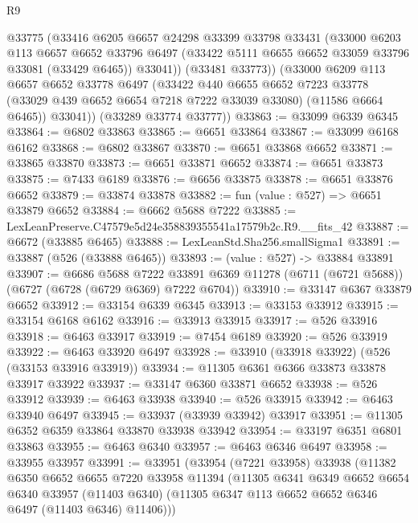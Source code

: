 \begin{lexlean}{R9}
\begin{coremodule}
          @33775
          (@33416
            @6205
            @6657
            @24298
            @33399
            @33798
            @33431
            (@33000
              @6203
              @113
              @6657
              @6652
              @33796
              @6497
              (@33422 @5111 @6655 @6652 @33059 @33796 @33081 (@33429 @6465))
              @33041))
          (@33481 @33773))
        (@33000
          @6209
          @113
          @6657
          @6652
          @33778
          @6497
          (@33422
            @440
            @6655
            @6652
            @7223
            @33778
            (@33029 @439 @6652 @6654 @7218 @7222 @33039 @33080)
            (@11586 @6664 @6465))
          @33041))
      (@33289 @33774 @33777))
@33863 := @33099 @6339 @6345
@33864 := @6802 @33863
@33865 := @6651 @33864
@33867 := @33099 @6168 @6162
@33868 := @6802 @33867
@33870 := @6651 @33868 @6652
@33871 := @33865 @33870
@33873 := @6651 @33871 @6652
@33874 := @6651 @33873
@33875 := @7433 @6189
@33876 := @6656 @33875
@33878 := @6651 @33876 @6652
@33879 := @33874 @33878
@33882 := fun (value : @527) => @6651 @33879 @6652
@33884 := @6662 @5688 @7222
@33885 := LexLeanPreserve.C47579e5d24e358839355541a17579b2c.R9.__fits_42
@33887 := @6672 (@33885 @6465)
@33888 := LexLeanStd.Sha256.smallSigma1
@33891 := @33887 (@526 (@33888 @6465))
@33893 := (value : @527) -> @33884 @33891
@33907 := @6686
    @5688
    @7222
    @33891
    @6369
    @11278
    (@6711 (@6721 @5688))
    (@6727 (@6728 (@6729 @6369) @7222 @6704))
@33910 := @33147 @6367 @33879 @6652
@33912 := @33154 @6339 @6345
@33913 := @33153 @33912
@33915 := @33154 @6168 @6162
@33916 := @33913 @33915
@33917 := @526 @33916
@33918 := @6463 @33917
@33919 := @7454 @6189
@33920 := @526 @33919
@33922 := @6463 @33920 @6497
@33928 := @33910 (@33918 @33922) (@526 (@33153 @33916 @33919))
@33934 := @11305 @6361 @6366 @33873 @33878 @33917 @33922
@33937 := @33147 @6360 @33871 @6652
@33938 := @526 @33912
@33939 := @6463 @33938
@33940 := @526 @33915
@33942 := @6463 @33940 @6497
@33945 := @33937 (@33939 @33942) @33917
@33951 := @11305 @6352 @6359 @33864 @33870 @33938 @33942
@33954 := @33197 @6351 @6801 @33863
@33955 := @6463 @6340
@33957 := @6463 @6346 @6497
@33958 := @33955 @33957
@33991 := @33951
    (@33954
      (@7221 @33958)
      @33938
      (@11382
        @6350
        @6652
        @6655
        @7220
        @33958
        @11394
        (@11305
          @6341
          @6349
          @6652
          @6654
          @6340
          @33957
          (@11403 @6340)
          (@11305 @6347 @113 @6652 @6652 @6346 @6497 (@11403 @6346) @11406)))

\end{coremodule}
\end{lexlean}
